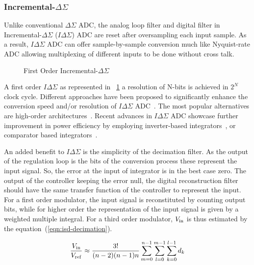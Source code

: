 \subsubsection{Incremental-\(\Delta\Sigma \)}
\label{sec:soa-isd}
Unlike conventional \(\Delta\Sigma \) ADC, the analog loop filter and digital filter in Incremental-\(\Delta\Sigma \) (\(I\Delta\Sigma \)) ADC are reset after oversampling each input sample. As a result, \(I\Delta\Sigma \) ADC can offer sample-by-sample conversion much like Nyquist-rate ADC allowing multiplexing of different inputs to be done without cross talk.

\begin{figure}[htp]
	\centering
	\resizebox{\textwidth}{!} {}
	\caption{First Order Incremental-\(\Delta\Sigma \)}
	\label{fig:isd_first_order_principle}
\end{figure}

A first order \(I\Delta\Sigma \) as represented in \figurename~\ref{fig:isd_first_order_principle} a resolution of N-bits is achieved in \(2^N \) clock cycle. Different approaches have been proposed to significantly enhance the conversion speed and/or resolution of \(I\Delta\Sigma \) ADC~\cite{Markus2004,Quiquempoix2006,Caldwell2010}. The most popular alternatives are high-order architectures~\cite{Au1997,Babanezhad1991,Baird1996}. Recent advances in \(I\Delta\Sigma \) ADC showcase further improvement in power efficiency by employing inverter-based integrators~\cite{Chae2009}, or comparator based integrators~\cite{Yamamoto2012}.

An added benefit to \(I\Delta\Sigma \) is the simplicity of the decimation filter. As the output of the regulation loop is the bits of the conversion process these represent the input signal. So, the error at the input of integrator is in the best case zero. The output of the controller keeping the error null, the digital reconstruction filter should have the same transfer function of the controller to represent the input. For a first order modulator, the input signal is reconstituted by counting output bits, while for higher order the representation of the input signal is given by a weighted multiple integral. For a third order modulator, \(V_{\rm in}\) is thus estimated by the equation~(\ref{eqn:isd-decimation}).

\begin{equation}
	\frac{V_{\rm in}}{V_{\rm ref}}\approx \frac{3!}{(n-2)(n-1)n}\sum_{m=0}^{n-1}\sum_{l=0}^{m-1}\sum_{k=0}^{l-1}d_{k}
\label{eqn:isd-decimation}
\end{equation}

